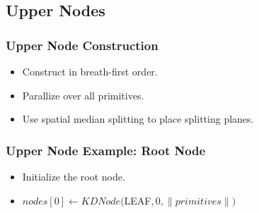 \documentclass{beamer}
\newcommand{\drawTri}[3]{
  \draw[fill=lightgray, drop shadow, rounded corners=0mm] (#1) -- (#2) -- (#3) -- (#1);
}
\newcommand{\drawAabb}[4]{
    \draw[dashed] (#1) -- (#2) -- (#3) -- (#4) -- (#1);
}
\newcommand{\axes}[2]{
  \draw[->] (0,0) -- coordinate (x axis mid) (#1,0);
  \draw[->] (0,0) -- coordinate (y axis mid) (0,#2);
  \foreach \x in {0,2,...,#1}
            \draw (\x,1pt) -- (\x,-3pt)
		    node[anchor=north] {\x};
  \foreach \y in {0,2,...,#2}
     	    \draw (1pt,\y) -- (-3pt,\y) 
     		    node[anchor=east] {\y}; 

}
\newcommand{\scene}{
  \axes{11}{9}

  \drawTri{0,6}{2,8}{2,4}
  \draw (1.33,6.5) node {0};
  \drawTri{2,6}{4,8}{2,8}
  \draw (2.66,7.33) node {1};
  \drawTri{2,6}{4,4}{2,4}
  \draw (2.67,4.67) node {3};

  \drawTri{7,8}{7,4}{9,4}
  \draw (7.67,5.33) node {2};
  \drawTri{9,0}{10,2}{6,3}
  \draw (8.33,1.66) node {4};
  \drawTri{6,3}{6,1}{8,1}
  \draw (6.67,1.67) node {5};
}
\newcommand{\sceneAabb}{
  \drawAabb{0,4}{0,8}{2,8}{2,4}
  \drawAabb{2,4}{2,6}{4,6}{4,4}
  \drawAabb{2,6}{2,8}{4,8}{4,6}
  \drawAabb{7,4}{7,8}{9,8}{9,4}
  \drawAabb{6,0}{6,3}{10,3}{10,0}
  \drawAabb{6,1}{6,3}{8,3}{8,1}
}
\begin{document}
\subsection{Upper Nodes}
\begin{frame}
  \frametitle{Upper Node Construction}
  
  \begin{itemize}
  \item Construct in breath-first order.
  \item Parallize over all primitives.
  \item Use spatial median splitting to place splitting planes.
  \end{itemize}
\end{frame}


  


\begin{frame}
  \frametitle{Upper Node Example: Root Node}
  
  \begin{itemize}
    \item Initialize the root node.
    \item $nodes[0] \leftarrow KDNode($LEAF$, 0, \|primitives\|)$
  \end{itemize}

\end{frame}
\end{document}
